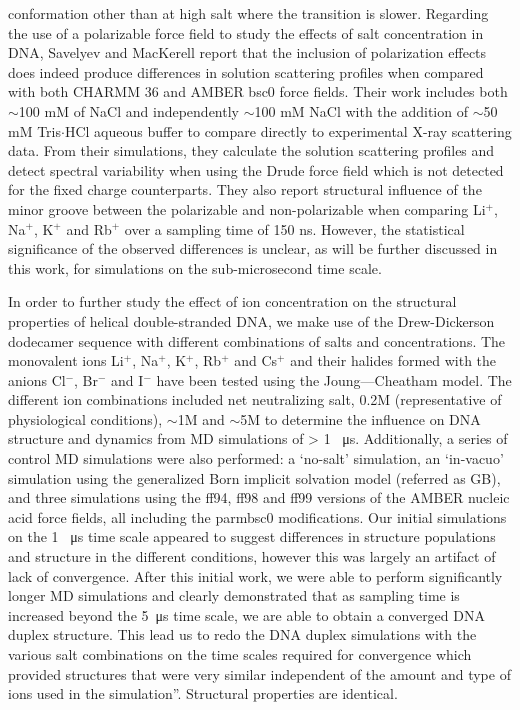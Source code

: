 \documentclass[9pt,lessons]{livecoms}
\begin{document}
conformation other than at high salt where the transition is slower.
Regarding the use of a polarizable force field to study the effects of
salt concentration in DNA, Savelyev and MacKerell report that the
inclusion of polarization effects does indeed produce differences in
solution scattering profiles when compared with both CHARMM 36 and
AMBER bsc0 force fields\cite{Rueda2004}. Their work includes both $\sim$100
mM of NaCl and independently $\sim$100 mM NaCl with the addition of $\sim$50 mM Tris$\cdot$HCl
aqueous buffer to compare directly to experimental X-ray scattering
data. From their simulations, they calculate the solution scattering
profiles and detect spectral variability when using the Drude force
field which is not detected for the fixed charge counterparts. They
also report structural influence of the minor groove between the
polarizable and non-polarizable when comparing Li$^{+}$, Na$^{+}$,
K$^{+}$ and Rb$^{+}$ over a sampling time of 150 ns. However, the
statistical significance of the observed differences is unclear, as
will be further discussed in this work, for simulations on the
sub-microsecond time scale.

In order to further study the effect of ion concentration on the
structural properties of helical double-stranded DNA, we make use of
the Drew-Dickerson\cite{Drew1981} dodecamer sequence with different
combinations of salts and concentrations. The monovalent ions
Li$^{+}$, Na$^{+}$, K$^{+}$, Rb$^{+}$ and Cs$^{+}$ and their halides
formed with the anions Cl$^{-}$, Br$^{-}$ and I$^{-}$ have been tested
using the Joung—Cheatham model\cite{Joung2008,Joung2008a}. The
different ion combinations included net neutralizing salt, 0.2M
(representative of physiological conditions), $\sim$1M and $\sim$5M to
determine the influence on DNA structure and dynamics from MD
simulations of > 1 \SI{}{\micro\second}. Additionally, a series of
control MD simulations were also performed: a ‘no-salt’ simulation, an
‘in-vacuo’ simulation using the generalized Born implicit solvation
model (referred as GB), and three simulations using the ff94, ff98 and
ff99 versions of the AMBER nucleic acid force fields, all including
the parmbsc0\cite{Perez2007} modifications. Our initial simulations on the 1 \SI{}{\micro\second} time scale appeared to suggest differences in structure populations and structure in the different conditions,
however this was largely an artifact of lack of convergence. After this initial work, we were able to perform significantly longer MD simulations and clearly demonstrated that as sampling time is
increased beyond the 5\SI{}{\micro\second} time scale, we are able to obtain a converged DNA duplex structure\cite{Galindo-Murillo2014,Galindo-Murillo2014a}. This lead us to redo the DNA duplex simulations with the various salt combinations on the
time scales required for convergence which provided structures that were very similar independent of the amount and type of ions used in the simulation''. Structural properties are identical.
\end{document}
